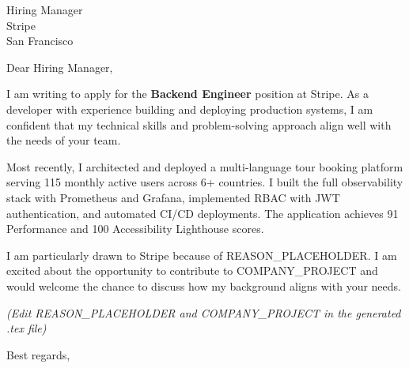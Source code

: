 \documentclass[11pt]{letter}
\begin{document}
\begin{letter}{Hiring Manager \\ Stripe \\ San Francisco}
\opening{Dear Hiring Manager,}

I am writing to apply for the \textbf{Backend Engineer} position at Stripe. As a developer with experience building and deploying production systems, I am confident that my technical skills and problem-solving approach align well with the needs of your team.

Most recently, I architected and deployed a multi-language tour booking platform serving 115 monthly active users across 6+ countries. I built the full observability stack with Prometheus and Grafana, implemented RBAC with JWT authentication, and automated CI/CD deployments. The application achieves 91 Performance and 100 Accessibility Lighthouse scores.

I am particularly drawn to Stripe because of REASON\_PLACEHOLDER. I am excited about the opportunity to contribute to COMPANY\_PROJECT and would welcome the chance to discuss how my background aligns with your needs.

\textit{(Edit REASON\_PLACEHOLDER and COMPANY\_PROJECT in the generated .tex file)}

\closing{Best regards,}

\end{letter}
\end{document}

